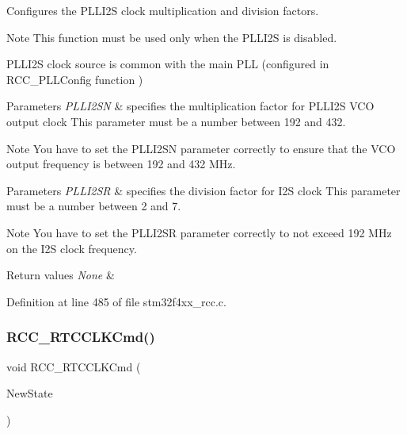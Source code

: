 Configures the P\+L\+L\+I2S clock multiplication and division factors. 

\begin{DoxyNote}{Note}
This function must be used only when the P\+L\+L\+I2S is disabled. 

P\+L\+L\+I2S clock source is common with the main P\+LL (configured in R\+C\+C\+\_\+\+P\+L\+L\+Config function )
\end{DoxyNote}

\begin{DoxyParams}{Parameters}
{\em P\+L\+L\+I2\+SN} & specifies the multiplication factor for P\+L\+L\+I2S V\+CO output clock This parameter must be a number between 192 and 432. \\
\hline
\end{DoxyParams}
\begin{DoxyNote}{Note}
You have to set the P\+L\+L\+I2\+SN parameter correctly to ensure that the V\+CO output frequency is between 192 and 432 M\+Hz.
\end{DoxyNote}

\begin{DoxyParams}{Parameters}
{\em P\+L\+L\+I2\+SR} & specifies the division factor for I2S clock This parameter must be a number between 2 and 7. \\
\hline
\end{DoxyParams}
\begin{DoxyNote}{Note}
You have to set the P\+L\+L\+I2\+SR parameter correctly to not exceed 192 M\+Hz on the I2S clock frequency.
\end{DoxyNote}

\begin{DoxyRetVals}{Return values}
{\em None} & \\
\hline
\end{DoxyRetVals}


Definition at line 485 of file stm32f4xx\+\_\+rcc.\+c.

\mbox{\label{group___r_c_c_ga9802f84846df2cea8e369234ed13b159}} 
\subsubsection{\texorpdfstring{R\+C\+C\+\_\+\+R\+T\+C\+C\+L\+K\+Cmd()}{RCC\_RTCCLKCmd()}}
{\footnotesize\ttfamily void R\+C\+C\+\_\+\+R\+T\+C\+C\+L\+K\+Cmd (\begin{DoxyParamCaption}\item[{Functional\+State}]{New\+State }\end{DoxyParamCaption})}



